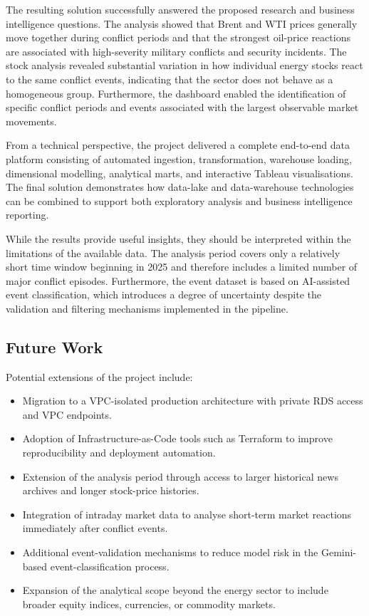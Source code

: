 \documentclass[11pt,a4paper]{article}
\begin{document}
The resulting solution successfully answered the proposed research
and business intelligence questions. The analysis showed that Brent
and WTI prices generally move together during conflict periods and
that the strongest oil-price reactions are associated with
high-severity military conflicts and security incidents. The stock
analysis revealed substantial variation in how individual energy
stocks react to the same conflict events, indicating that the sector
does not behave as a homogeneous group. Furthermore, the dashboard
enabled the identification of specific conflict periods and events
associated with the largest observable market movements.

From a technical perspective, the project delivered a complete
end-to-end data platform consisting of automated ingestion,
transformation, warehouse loading, dimensional modelling, analytical
marts, and interactive Tableau visualisations. The final solution
demonstrates how data-lake and data-warehouse technologies can be
combined to support both exploratory analysis and business
intelligence reporting.

While the results provide useful insights, they should be interpreted
within the limitations of the available data. The analysis period
covers only a relatively short time window beginning in 2025 and
therefore includes a limited number of major conflict episodes.
Furthermore, the event dataset is based on AI-assisted event
classification, which introduces a degree of uncertainty despite the
validation and filtering mechanisms implemented in the pipeline.

\subsection{Future Work}
\label{sec:future_work}

Potential extensions of the project include:

\begin{itemize}
\item Migration to a VPC-isolated production architecture with
private RDS access and VPC endpoints.

\item Adoption of Infrastructure-as-Code tools such as Terraform to
improve reproducibility and deployment automation.

\item Extension of the analysis period through access to larger
historical news archives and longer stock-price histories.

\item Integration of intraday market data to analyse short-term market
reactions immediately after conflict events.

\item Additional event-validation mechanisms to reduce model risk in
the Gemini-based event-classification process.

\item Expansion of the analytical scope beyond the energy sector to
include broader equity indices, currencies, or commodity markets.
\end{itemize}
\end{document}
